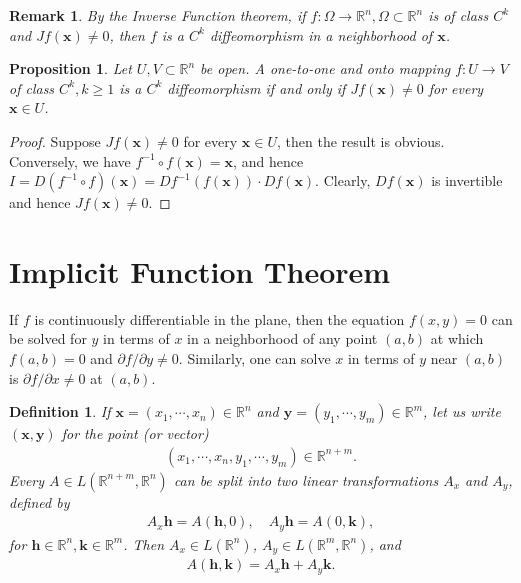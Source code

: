 \documentclass[11pt]{book}
\newtheorem{definition}{Definition}[chapter]
\newtheorem{proposition}{Proposition}[chapter]
\newtheorem{remark}{Remark}[chapter]
\theoremstyle{definition}
\numberwithin{equation}{chapter}
\begin{document}
\begin{remark}
By the Inverse Function theorem, if $f: \Omega \to \mathbb{R}^n, \Omega \subset \mathbb{R}^n$ is of class $C^k$ and $Jf(\mathbf{x}) \neq 0$, then $f$ is a $C^k$ diffeomorphism in a neighborhood of $\mathbf{x}$.
\end{remark}

\medskip

\begin{proposition}\label{prop_75}
Let $U,V \subset \mathbb{R}^n$ be open. A one-to-one and onto mapping $f: U \to V$ of class $C^k, k \geq 1$ is a $C^k$ diffeomorphism if and only if $Jf(\mathbf{x}) \neq 0$ for every $\mathbf{x} \in U$.
\end{proposition}
\begin{proof}
Suppose $Jf(\mathbf{x}) \neq 0$ for every $\mathbf{x} \in U$, then the result is obvious. Conversely, we have $f^{-1} \circ f(\mathbf{x}) = \mathbf{x}$, and hence $I = D(f^{-1} \circ f)(\mathbf{x}) = Df^{-1}(f(\mathbf{x})) \cdot Df(\mathbf{x})$. Clearly, $Df(\mathbf{x})$ is invertible and hence $Jf(\mathbf{x}) \neq 0$.
\end{proof}

\medskip




\section{Implicit Function Theorem}\label{section_75}

If $f$ is continuously differentiable in the plane, then the equation $f(x,y) = 0$ can be solved for $y$ in terms of $x$ in a neighborhood of any point $(a,b)$ at which $f(a,b) = 0$ and $\partial f/\partial y \neq 0$. Similarly, one can solve $x$ in terms of $y$ near $(a,b)$ is $\partial f/\partial x \neq 0$ at $(a,b)$.

\medskip

\begin{definition}
If $\mathbf{x} = (x_1,\cdots,x_n) \in \mathbb{R}^n$ and $\mathbf{y} = (y_1,\cdots,y_m) \in \mathbb{R}^m$, let us write $(\mathbf{x},\mathbf{y})$ for the point (or vector)
\begin{align*}
    (x_1,\cdots,x_n, y_1,\cdots,y_m) \in \mathbb{R}^{n+m}.
\end{align*}
Every $A \in L(\mathbb{R}^{n+m}, \mathbb{R}^n)$ can be split into two linear transformations $A_x$ and $A_y$, defined by
\begin{align*}
    A_x \mathbf{h} = A(\mathbf{h},0), \quad A_y \mathbf{h} = A(0,\mathbf{k}),
\end{align*}
for $\mathbf{h} \in \mathbb{R}^n, \mathbf{k} \in \mathbb{R}^m$. Then $A_x \in L(\mathbb{R}^n)$, $A_y \in L(\mathbb{R}^m,\mathbb{R}^n)$, and
\begin{align}\label{def_714_equ1}
    A(\mathbf{h},\mathbf{k}) = A_x \mathbf{h} + A_y \mathbf{k}.
\end{align}
\end{definition}
\end{document}
